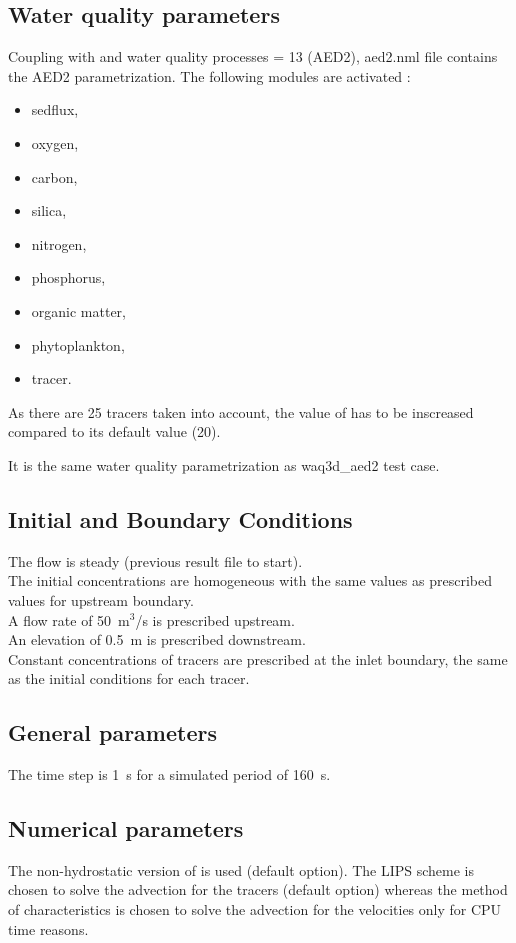\subsection{Water quality parameters}
Coupling with \waqtel and water quality processes = 13 (AED2),
aed2.nml file contains the AED2 parametrization.
The following modules are activated :
\begin{itemize}
\item sedflux,
\item oxygen,
\item carbon,
\item silica,
\item nitrogen,
\item phosphorus,
\item organic matter,
\item phytoplankton,
\item tracer.
\end{itemize}

As there are 25 tracers taken into account, the value of
 has to be inscreased compared to its default
value (20).

It is the same water quality parametrization as waq3d\_aed2 test case.
%
\subsection{Initial and Boundary Conditions}
%
The flow is steady (previous result file to start).\\
The initial concentrations are homogeneous with the same values
as prescribed values for upstream boundary.\\

A flow rate of 50~m$^3$/s is prescribed upstream.\\
An elevation of 0.5~m is prescribed downstream.\\
Constant concentrations of tracers are prescribed at the inlet boundary,
the same as the initial conditions for each tracer.
%
\subsection{General parameters}
%
The time step is 1~s for a simulated period of 160~s.
%
\subsection{Numerical parameters}
%
The non-hydrostatic version of  is used (default option).
The LIPS scheme is chosen to solve the advection for the tracers
(default option) whereas the method of characteristics is chosen
to solve the advection for the velocities only for CPU time reasons.
%
